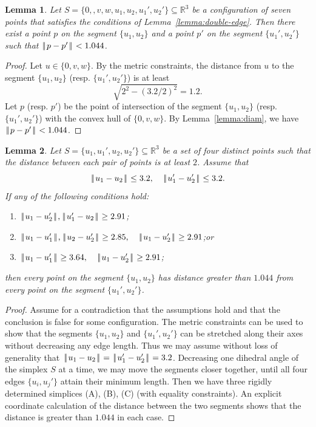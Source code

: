 \documentclass[11pt]{amsart}
\newcommand{\ring}[1]{\mathbb{#1}}
\def\|{{\hskip0.1em|\hskip-0.15em|\hskip0.1em}}
\let\subset=\subseteq
\newtheorem{lemma}{Lemma}
\begin{document}
\begin{lemma}\label{lemma:7small}  
Let $S=\{0,,v,w,u_1,u_2,u_1',u_2'\}\subset\ring{R}^3$
be a configuration of seven points that satisfies
the conditions of Lemma~\ref{lemma:double-edge}.  Then there exist
a point $p$ on the segment $\{u_1,u_2\}$ and  a point $p'$ on the segment
$\{u_1',u_2'\}$ such that $\|p-p'\|<1.044$.
\end{lemma}

\begin{proof} Let $u\in\{0,v,w\}$.  By the metric constraints, the
distance from $u$ to the segment $\{u_1,u_2\}$ (resp. $\{u_1',u_2'\}$) is at least
$$\sqrt{2^2 - (3.2/2)^2} = 1.2.$$
Let $p$ (resp. $p'$) be the point of intersection of the segment $\{u_1,u_2\}$ 
(resp. $\{u_1',u_2'\}$) with
the convex hull of $\{0,v,w\}$.  By Lemma~\ref{lemma:diam},
we have $\|p-p'\|<1.044$.
\end{proof}

\begin{lemma}\label{lemma:abc}
Let $S=\{u_1,u_1',u_2,u_2'\}\subset\ring{R}^3$ be a set of four distinct points such that the distance between each pair of points is at least $2$.  Assume that
$$
\|u_1-u_2\|\le 3.2,\quad \|u_1'-u_2'\|\le 3.2.
$$
If any of the following conditions hold:
{
\renewcommand{\labelenumi}{(\Alph{enumi})~~}
\begin{enumerate}
\item $\|u_1-u_2'\|,\|u_1'-u_2\|\ge 2.91$;
\item $\|u_1-u_1'\|,\|u_2-u_2'\|\ge 2.85,\quad \|u_1-u_2'\|\ge 2.91$;\quad or
\item $\|u_1-u_1'\|\ge 3.64,\quad \|u_1-u_2'\|\ge 2.91$;
\end{enumerate}
}
then every point on the segment $\{u_1,u_2\}$ has distance greater than $1.044$ from every point on the segment $\{u_1',u_2'\}$.
\end{lemma}

\begin{proof} Assume for a contradiction that the assumptions hold and that
the conclusion is false for some configuration.  The metric constraints can be used to show that the segments $\{u_1,u_2\}$ and $\{u_1',u_2'\}$ can be stretched along their axes without decreasing any edge length.  
%
Thus we may assume without loss of generality that $\|u_1-u_2\|=\|u_1'-u_2'\|=3.2$.  Decreasing one dihedral angle of the simplex $S$ at a time, we may move the segments closer together, until all four edges $\{u_i,u_j'\}$ attain their minimum length.  
%
Then we have three rigidly determined simplices (A), (B), (C) (with equality constraints).  An explicit coordinate calculation of the distance between the two segments shows that the distance is greater than $1.044$ in each case.
\end{proof}
\end{document}

